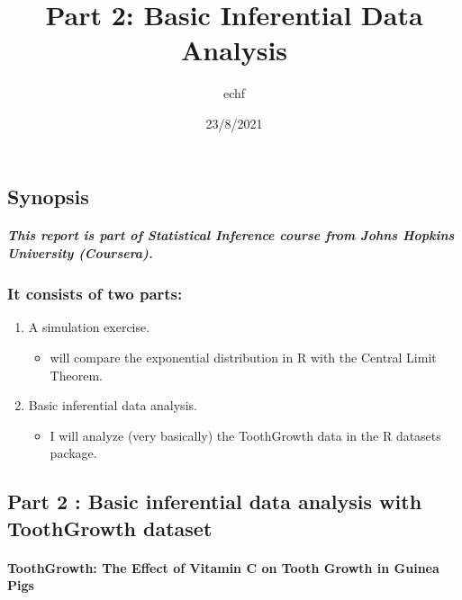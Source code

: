 \documentclass[
]{article}
\title{Part 2: Basic Inferential Data Analysis}
\author{echf}
\date{23/8/2021}
\providecommand{\tightlist}{%
  \setlength{\itemsep}{0pt}\setlength{\parskip}{0pt}}
\begin{document}
\maketitle

\hypertarget{synopsis}{%
\subsection{Synopsis}\label{synopsis}}

\hypertarget{this-report-is-part-of-statistical-inference-course-from-johns-hopkins-university-coursera.}{%
\subparagraph{This report is part of Statistical Inference course from
Johns Hopkins University
(Coursera).}\label{this-report-is-part-of-statistical-inference-course-from-johns-hopkins-university-coursera.}}

\hypertarget{it-consists-of-two-parts}{%
\subsubsection{It consists of two
parts:}\label{it-consists-of-two-parts}}

\begin{enumerate}
\def\labelenumi{\arabic{enumi}.}
\tightlist
\item
  A simulation exercise.

  \begin{itemize}
  \tightlist
  \item
    will compare the exponential distribution in R with the Central
    Limit Theorem.
  \end{itemize}
\item
  Basic inferential data analysis.

  \begin{itemize}
  \tightlist
  \item
    I will analyze (very basically) the ToothGrowth data in the R
    datasets package.
  \end{itemize}
\end{enumerate}

\hypertarget{part-2-basic-inferential-data-analysis-with-toothgrowth-dataset}{%
\subsection{Part 2 : Basic inferential data analysis with ToothGrowth
dataset}\label{part-2-basic-inferential-data-analysis-with-toothgrowth-dataset}}

\hypertarget{toothgrowth-the-effect-of-vitamin-c-on-tooth-growth-in-guinea-pigs}{%
\paragraph{ToothGrowth: The Effect of Vitamin C on Tooth Growth in
Guinea
Pigs}\label{toothgrowth-the-effect-of-vitamin-c-on-tooth-growth-in-guinea-pigs}}
\end{document}
